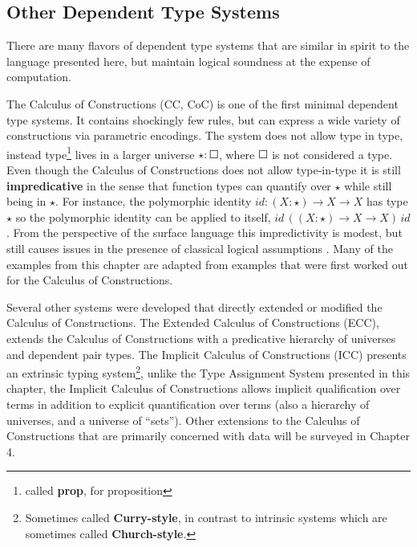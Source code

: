 
\subsection{Other Dependent Type Systems}

There are many flavors of dependent type systems that are similar in spirit to the language presented here, but maintain logical soundness at the expense of computation.


The Calculus of Constructions (CC, CoC)\cite{10.1016/0890-5401(88)90005-3} is one of the first minimal dependent type systems.
It contains shockingly few rules, but can express a wide variety of constructions via parametric encodings.
The system does not allow type in type, instead type\footnote{called \textbf{prop}, for proposition} lives in a larger universe $\star:\Square$, where $\Square$ is not considered a type.
Even though the Calculus of Constructions does not allow type-in-type it is still \textbf{impredicative }in the sense that function types can quantify over $\star$ while still being in $\star$.
For instance, the polymorphic identity $id:(X:\star)\rightarrow X\rightarrow X$ has type $\star$ so the polymorphic identity can be applied to itself, $id\,\left((X:\star)\rightarrow X\rightarrow X\right)\,id$.
From the perspective of the surface language this impredictivity is modest, but still causes issues in the presence of classical logical assumptions .
Many of the examples from this chapter are adapted from examples that were first worked out for the Calculus of Constructions.

Several other systems were developed that directly extended or modified the Calculus of Constructions.
The Extended Calculus of Constructions (ECC)\cite{luo1990extended,luo1994computation}, extends the Calculus of Constructions with a predicative hierarchy of universes and dependent pair types.
The Implicit Calculus of Constructions (ICC)\cite{10.1007/3-540-45413-6_27,10.1007/978-3-540-78499-9_26} presents an extrinsic typing system\footnote{Sometimes called \textbf{Curry-style}, in contrast to intrinsic systems which are sometimes called \textbf{Church-style}.}, unlike the Type Assignment System presented in this chapter, the Implicit Calculus of Constructions allows implicit qualification over terms in addition to explicit quantification over terms (also a hierarchy of universes, and a universe of ``sets'').
Other extensions to the Calculus of Constructions that are primarily concerned with data will be surveyed in Chapter 4.

